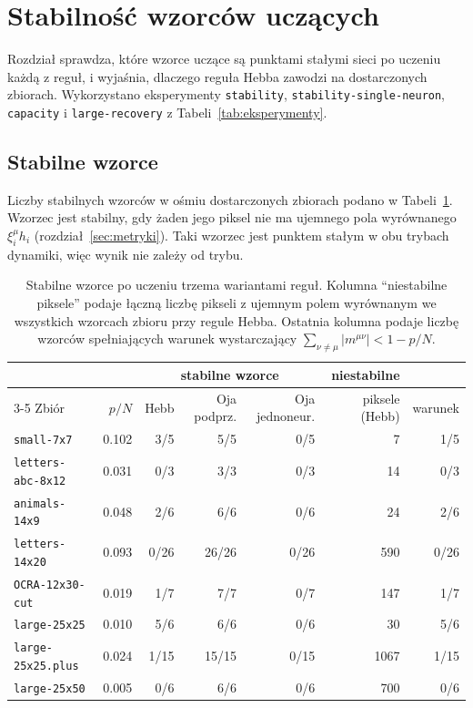 \section{Stabilność wzorców uczących}
\label{sec:stabilnosc}

Rozdział sprawdza, które wzorce uczące są punktami stałymi sieci po uczeniu każdą z reguł, i wyjaśnia, dlaczego reguła Hebba zawodzi na dostarczonych zbiorach. Wykorzystano eksperymenty \texttt{stability}, \texttt{stability-single-neuron}, \texttt{capacity} i \texttt{large-recovery} z Tabeli~\ref{tab:eksperymenty}.

\subsection{Stabilne wzorce}
\label{sec:stabilne-wzorce}

Liczby stabilnych wzorców w ośmiu dostarczonych zbiorach podano w Tabeli~\ref{tab:stabilne}. Wzorzec jest stabilny, gdy żaden jego piksel nie ma ujemnego pola wyrównanego $\xi^\mu_i h_i$ (rozdział~\ref{sec:metryki}). Taki wzorzec jest punktem stałym w obu trybach dynamiki, więc wynik nie zależy od trybu.

\begin{table}[H]
    \centering
    \caption{Stabilne wzorce po uczeniu trzema wariantami reguł. Kolumna \enquote{niestabilne piksele} podaje łączną liczbę pikseli z ujemnym polem wyrównanym we wszystkich wzorcach zbioru przy regule Hebba. Ostatnia kolumna podaje liczbę wzorców spełniających warunek wystarczający $\sum_{\nu \ne \mu} \lvert m^{\mu\nu} \rvert < 1 - p/N$.}
    \label{tab:stabilne}
    \small
    \begin{tabular}{l r r r r r r}
        \toprule
        & & \multicolumn{3}{c}{stabilne wzorce} & niestabilne & \\
        \cmidrule(lr){3-5}
        Zbiór & $p/N$ & Hebb & Oja podprz. & Oja jednoneur. & piksele (Hebb) & warunek \\
        \midrule
        \texttt{small-7x7} & \num{0.102} & 3/5 & 5/5 & 0/5 & 7 & 1/5 \\
        \texttt{letters-abc-8x12} & \num{0.031} & 0/3 & 3/3 & 0/3 & 14 & 0/3 \\
        \texttt{animals-14x9} & \num{0.048} & 2/6 & 6/6 & 0/6 & 24 & 2/6 \\
        \texttt{letters-14x20} & \num{0.093} & 0/26 & 26/26 & 0/26 & 590 & 0/26 \\
        \texttt{OCRA-12x30-cut} & \num{0.019} & 1/7 & 7/7 & 0/7 & 147 & 1/7 \\
        \texttt{large-25x25} & \num{0.010} & 5/6 & 6/6 & 0/6 & 30 & 5/6 \\
        \texttt{large-25x25.plus} & \num{0.024} & 1/15 & 15/15 & 0/15 & \num{1067} & 1/15 \\
        \texttt{large-25x50} & \num{0.005} & 0/6 & 6/6 & 0/6 & 700 & 0/6 \\
        \bottomrule
    \end{tabular}
\end{table}

